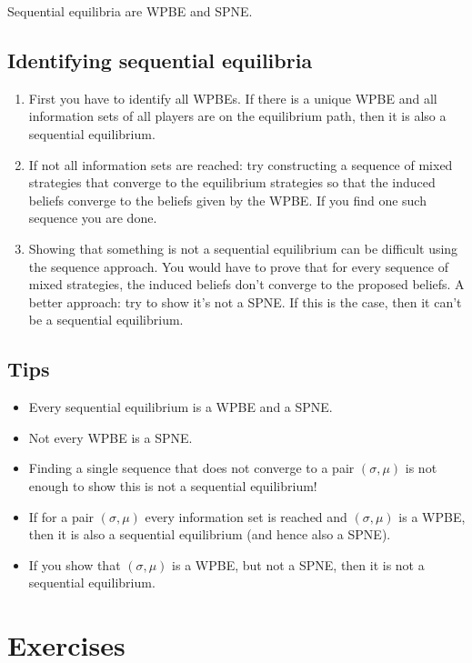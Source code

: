 \documentclass[10pt]{article}
\theoremstyle{basic}
\begin{document}
\begin{spacing}{1.0}
Sequential equilibria are WPBE and SPNE.

\subsection{Identifying sequential equilibria}

\begin{enumerate}
\item First you have to identify all WPBEs. If there is a unique WPBE and
  all information sets of all players are on the equilibrium path, then it
  is also a sequential equilibrium.
\item If not all information sets are reached: try constructing a sequence
  of mixed strategies that converge to the equilibrium strategies so that
  the induced beliefs converge to the beliefs given by the WPBE. If you
  find one such sequence you are done.
\item Showing that something is not a sequential equilibrium can be
  difficult using the sequence approach. You would have to prove that for
  every sequence of mixed strategies, the induced beliefs don't converge to
  the proposed beliefs. A better approach: try to show it's not a
  SPNE. If this is the case, then it can't be a sequential equilibrium.
\end{enumerate}

\subsection{Tips}

\begin{itemize}
\item Every sequential equilibrium is a WPBE and a SPNE.
\item Not every WPBE is a SPNE.
\item Finding a single sequence that does not converge to a pair $(\sigma,
  \mu)$ is not enough to show this is not a sequential equilibrium!
\item If for a pair $(\sigma, \mu)$ every information set is reached and
  $(\sigma, \mu)$ is a WPBE, then it is also a sequential equilibrium (and
  hence also a SPNE).
\item If you show that $(\sigma, \mu)$ is a WPBE, but not a SPNE, then it
  is not a sequential equilibrium.
\end{itemize}

\newpage
\section{Exercises}


\end{spacing}
\end{document}

